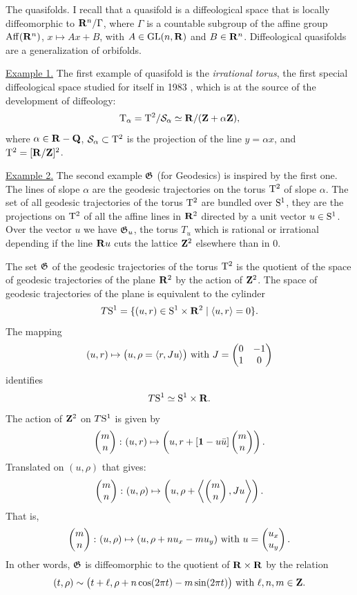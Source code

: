 \begin{Article}{The quasifolds.}{}
  I recall that a quasifold is a diffeological space that is locally diffeomorphic to $\mathbf{R}^n/\Gamma$,
  where $\Gamma$ is a countable subgroup of the affine group $\operatorname{Aff}(\mathbf{R}^n)$,
  $x \mapsto A x + B$,
  with $A \in \mathrm{GL}(n,\mathbf{R})$ and $B \in \mathbf{R}^n$.
  Diffeological quasifolds are a generalization of orbifolds.
  
  \uline{Example 1.} The first example of quasifold is the {\em irrational torus},
  the first special diffeological space studied for itself in 1983 \cite{DI83},
  which is at the source of the development of diffeology:
  \[
    \mathrm{T}_\alpha = \mathrm{T}^2/\mathcal{S}_\alpha \simeq \mathbf{R}/(\mathbf{Z} + \alpha \mathbf{Z}),
    \]
  where $\alpha \in \mathbf{R} - \mathbf{Q}$,
  $\mathcal{S}_\alpha \subset \mathrm{T}^2$ is the projection of the line $y = \alpha x$,
  and $\mathrm{T}^2 = [\mathbf{R}/\mathbf{Z}]^2$.
  
  \uline{Example 2.} The second example ${\mathfrak G}$ (for Geodesics) is inspired by the first one.
  The lines of slope $\alpha$ are the geodesic trajectories on the torus $\mathrm{T}^2$ of slope $\alpha$.
  The set of all geodesic trajectories of the torus $\mathrm{T}^2$ are bundled over $\mathrm{S}^1$,
  they are the projections on $\mathrm{T}^2$ of all the affine lines in $\mathbf{R}^2$ directed by a unit vector $u \in \mathrm{S}^1$.
  Over the vector $u$ we have ${\mathfrak G}_u$,
  the torus $T_u$ which is rational or irrational depending if the line $\mathbf{R} u$ cuts the lattice $\mathbf{Z}^2$ elsewhere than in $0$.
  
  The set ${\mathfrak G}$ of the geodesic trajectories of the torus $\mathrm{T}^2$ is the quotient of the space of geodesic trajectories of the plane $\mathbf{R}^2$ by the action of $\mathbf{Z}^2$.
  The space of geodesic trajectories of the plane is equivalent to the cylinder
  \[
    T{\mathrm{S}^1} = \{(u,r) \in \mathrm{S}^1 \times \mathbf{R}^2 \mid \langle u,r\rangle =0 \}.
    \]
  The mapping
  \[
    (u,r) \mapsto \big(u,\rho = \langle r, J u \rangle\big)
    \ \text{with}\ 
    J = \begin{pmatrix}0 & -1 \\ 1 & 0\end{pmatrix}
    \]
  identifies
  \[
    T{\mathrm{S}^1} \simeq \mathrm{S}^1 \times \mathbf{R}.
    \]
  The action of $\mathbf{Z}^2$ on $T{\mathrm{S}^1}$ is given by
  \[
    \begin{pmatrix}m \\ n\end{pmatrix} \colon (u,r) \mapsto \left(u, r + [{\mathbf{1}} - u \bar u] \begin{pmatrix}m \\ n\end{pmatrix}\right).
    \]
  Translated on $(u,\rho)$ that gives:
  \[
    \begin{pmatrix}m \\ n\end{pmatrix} \colon (u,\rho) \mapsto \left(u, \rho + \left\langle  \begin{pmatrix}m \\ n\end{pmatrix} , Ju \right\rangle\right).
    \]
  That is,
  \[
    \begin{pmatrix}m \\ n\end{pmatrix} \colon (u,\rho) \mapsto (u, \rho + n u_x - m u_y)
    \ \text{with}\ 
    u = \begin{pmatrix}u_x \\ u_y\end{pmatrix}.
    \]
  In other words,
  ${\mathfrak G}$ is diffeomorphic to the quotient of $\mathbf{R} \times \mathbf{R}$ by the relation
  \[
    (t,\rho) \sim \big(t+\ell, \rho + n \cos(2\pi t) - m \sin(2\pi t)\big)
    \ \text{with}\ 
    \ell, n, m \in \mathbf{Z}.
    \]
\end{Article}

